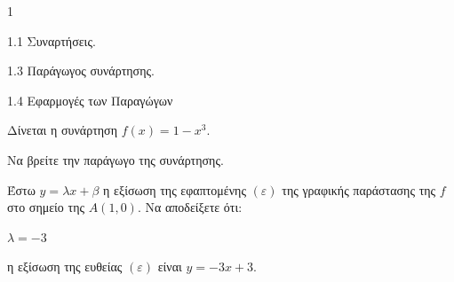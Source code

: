 \begin{ylh}{1}
    \item 1.1 Συναρτήσεις.
    \item 1.3 Παράγωγος συνάρτησης.
    \item 1.4 Εφαρμογές των Παραγώγων
\end{ylh}
Δίνεται η συνάρτηση $f(x)=1-x^3$.
\begin{alist}
\item Να βρείτε την παράγωγο της συνάρτησης. 

Έστω $y=\lambda x + \beta$ η εξίσωση της εφαπτομένης $(\varepsilon)$ της γραφικής παράστασης της $f$ στο σημείο της $Α(1,0)$. Να αποδείξετε ότι:

\item $\lambda = -3$ 
\item η εξίσωση της ευθείας $(\varepsilon)$ είναι $y=-3x+3$. 
\end{alist}

